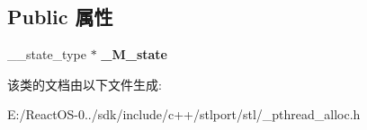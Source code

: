 \subsection*{Public 属性}
\begin{DoxyCompactItemize}
\item 
\mbox{\label{classper__thread__allocator_a681e80751f5ba9caedae206a38c0892c}} 
\+\_\+\+\_\+state\+\_\+type $\ast$ {\bfseries \+\_\+\+M\+\_\+state}
\end{DoxyCompactItemize}


该类的文档由以下文件生成\+:\begin{DoxyCompactItemize}
\item 
E\+:/\+React\+O\+S-\/0../sdk/include/c++/stlport/stl/\+\_\+pthread\+\_\+alloc.\+h\end{DoxyCompactItemize}
